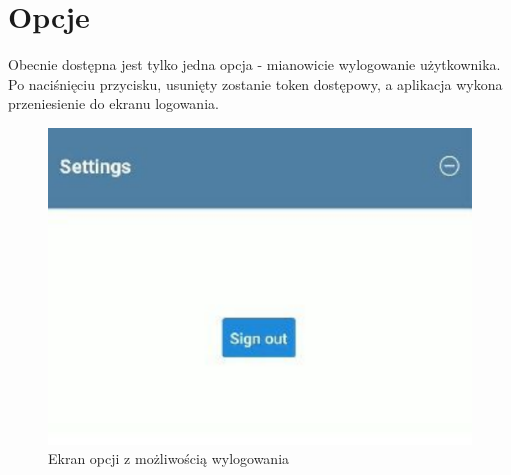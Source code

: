 \section{Opcje}
Obecnie dostępna jest tylko jedna opcja - mianowicie wylogowanie użytkownika. Po naciśnięciu przycisku, usunięty zostanie token dostępowy, a aplikacja wykona przeniesienie do ekranu logowania.
\begin{figure}[H]
	\centering
	\includegraphics{options.pdf}
	\caption{Ekran opcji z możliwością wylogowania}
\end{figure}

